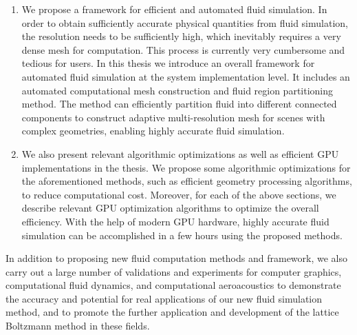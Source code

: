\begin{abstract*}[flattitle]
\begin{enumerate}
    \item We propose a framework for efficient and automated fluid simulation. In order to obtain sufficiently accurate physical quantities from fluid simulation, the resolution needs to be sufficiently high, which inevitably requires a very dense mesh for computation. This process is currently very cumbersome and tedious for users. In this thesis we introduce an overall framework for automated fluid simulation at the system implementation level. It includes an automated computational mesh construction and fluid region partitioning method. The method can efficiently partition fluid into different connected components to construct adaptive multi-resolution mesh for scenes with complex geometries, enabling highly accurate fluid simulation.
    \item We also present relevant algorithmic optimizations as well as efficient GPU implementations in the thesis. We propose some algorithmic optimizations for the aforementioned methods, such as efficient geometry processing algorithms, to reduce computational cost. Moreover, for each of the above sections, we describe relevant GPU optimization algorithms to optimize the overall efficiency. With the help of modern GPU hardware, highly accurate fluid simulation can be accomplished in a few hours using the proposed methods.
  \end{enumerate}

  In addition to proposing new fluid computation methods and framework, we also carry out a large number of validations and experiments for computer graphics, computational fluid dynamics, and computational aeroacoustics to demonstrate the accuracy and potential for real applications of our new fluid simulation method, and to promote the further application and development of the lattice Boltzmann method in these fields.
\end{abstract*}